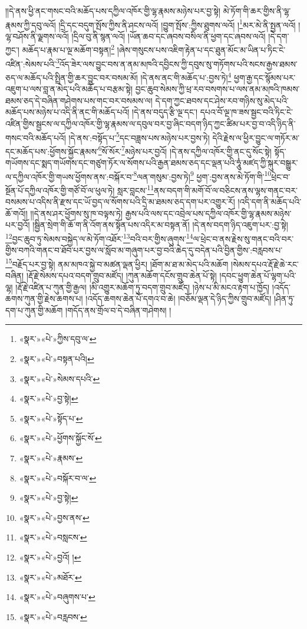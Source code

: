 །།དེ་ནས་ཕྱི་ནང་གསང་བའི་མཆོད་པས་དཀྱིལ་འཁོར་གྱི་ལྷ་རྣམས་མཉེས་པར་བྱ་སྟེ། མེ་ཏོག་གི་ཆར་གྱིས་ནི་ལྷ་རྣམས་ཀྱི་དབུ་ལའོ། །དྲི་དང་བདུག་སྤོས་ཀྱིས་ནི་ཤངས་ལའོ། །བྱུག་སྤོས་:ཀྱིས་ཐུགས་ལའོ། །\footnote{«སྣར་»«པེ་»ཀྱིས་དབུ་ལ་}མར་མེ་ནི་སྤྱན་ལའོ། །ལྷ་བཤོས་ནི་ལྗགས་ལའོ། །དྲིལ་བུ་ནི་སྙན་ལའོ། །ཡོན་ཆབ་དང་ཞབས་བསིལ་ནི་ཕྱག་དང་ཞབས་ལའོ། །དེ་དག་ཀྱང་། མཆོད་པ་རྣམ་པ་ལྔ་མཆོག་བསྟན།\footnote{«སྣར་»«པེ་»བསྟན་པའི།} །ཞེས་གསུངས་པས་འཇིག་རྟེན་པ་དང་ཐུན་མོང་མ་ཡིན་པ་ཏིང་ངེ་འཛིན་:སེམས་པའི་\footnote{«སྣར་»«པེ་»སེམས་དཔའི་}འོད་ཟེར་ལས་བྱུང་བས་ན་ནམ་མཁའི་དབྱིངས་ཀྱི་དབུས་སུ་གཏོགས་པའི་སངས་རྒྱས་ཐམས་ཅད་ལ་མཆོད་པའི་སྤྲིན་གྱི་ཆར་བྱུང་བར་བསམ་མོ། །དེ་ནས་ནང་གི་མཆོད་པ་:བྱས་ཏེ།\footnote{«སྣར་»«པེ་»བྱ་སྟེ།} ཕྱག་རྒྱ་དང་སྙོམས་པར་འཇུག་པ་ལས་བླ་ན་མེད་པའི་མཆོད་པ་བརྩམ་སྟེ། བྱང་ཆུབ་སེམས་ཀྱི་ཕྲ་རབ་བསགས་པ་ལས་ནམ་མཁའི་ཁམས་ཐམས་ཅད་དེ་བཞིན་གཤེགས་པས་གང་བར་བསམས་ལ། དེ་དག་ཀྱང་ཐབས་དང་ཤེས་རབ་གཉིས་སུ་མེད་པའི་མཆོད་པས་མཉེས་པ་འདི་ནི་ནང་གི་མཆོད་པའོ། །དེ་ནས་བདུད་རྩི་ལྔ་དང་། དཔའ་བོ་ལྔ་ཁ་ཟས་སྦྱང་བའི་ཏིང་ངེ་འཛིན་གྱིས་སྦྱངས་ལ་དཀྱིལ་འཁོར་གྱི་ལྷ་རྣམས་ལ་དབུལ་བར་བྱ་ཞིང་བདག་ཉིད་ཀྱང་ཚིམ་པར་བྱ་བ་འདི་ཉིད་ནི་གསང་བའི་མཆོད་པའོ། །དེ་ནས་:བསྟོད་པ་\footnote{«སྣར་»«པེ་»སྟོད་པ་}དང་བཟླས་པས་མཉེས་པར་བྱས་ཏེ། དེའི་རྗེས་ལ་ཕྱིར་བྱུང་ལ་གཏོར་མ་དང་མཆོད་པས་:ཕྱོགས་སྐྱོང་རྣམས་\footnote{«སྣར་»«པེ་»ཕྱོགས་སྐྱོང་སོ་}སོ་སོར་\footnote{«སྣར་»«པེ་»རྣམས་}མཉེས་པར་བྱའོ། །དེ་ནས་དཀྱིལ་འཁོར་གྱི་ནང་དུ་སོང་སྟེ། སྟོད་གཡོགས་དང་སྨད་གཡོགས་དང་གཙུག་ཏོར་ལ་སོགས་པའི་རྒྱན་ཐམས་ཅད་དང་ལྡན་པའི་ཧཱུཾ་མཛད་ཀྱི་སྐུར་བསྒྱུར་ལ་དཀྱིལ་འཁོར་གྱི་གཡས་ཕྱོགས་ནས་:བསྐོར་བ་\footnote{«སྣར་»«པེ་»བསྐོར་བ་ལ་}ལན་གསུམ་:བྱས་ཏེ།\footnote{«སྣར་»«པེ་»བྱ་སྟེ།} ཕྱག་:བྱས་ནས་མེ་ཏོག་གི་\footnote{«སྣར་»«པེ་»བྱས་ནས་}ཕྲེང་བ་སྔོན་པོ་དཀྱིལ་འཁོར་གྱི་གཙོ་བོ་ལ་ཕུལ་ཏེ། སླར་བླངས་\footnote{«སྣར་»«པེ་»བསླངས་}ནས་བདག་གི་མགོ་བོ་ལ་བཅིངས་ནས་ལྷས་གནང་བར་བསམས་པ་འདིས་ནི་རྫས་དང་ཡོ་བྱད་ལ་སོགས་པའི་དྲི་མ་ཐམས་ཅད་དག་པར་འགྱུར་རོ། །འདི་དག་ནི་མཆོད་པའི་ཆོ་གའོ།། །།དེ་ནས་ཤར་ཕྱོགས་སུ་ཁ་བལྟས་ཏེ། རྒྱས་པའི་ལས་དང་འབྲེལ་པས་དཀྱིལ་འཁོར་གྱི་ལྷ་རྣམས་མཉེས་པར་བྱའོ། །སྦྱིན་སྲེག་གི་ཆོ་ག་ནི་འོག་ནས་སྟོན་པས་འདིར་མ་བསྟན་ནོ། །དེ་ནས་བདག་ཉིད་འཇུག་པར་:བྱ་སྟེ། \footnote{«སྣར་»«པེ་»བྱའོ། ། }བྱང་ཆུབ་ཏུ་སེམས་བསྐྱེད་ལ་མེ་ཏོག་འཐོར་\footnote{«སྣར་»«པེ་»མཐོར་}བའི་བར་གྱིས་ཞུགས་\footnote{«སྣར་»«པེ་»བཞུགས་པ་}ལ་ཕྲེང་བ་ནས་རྗེས་སུ་གནང་བའི་བར་གྱིས་བཀའི་གནང་བ་ཐོབ་པར་བྱས་ལ་སློབ་མ་གཞུག་པར་བྱ་བའི་ཆེད་དུ་བདེན་པའི་བྱིན་གྱིས་:བརླབས་པ་\footnote{«སྣར་»«པེ་»བརླབས་}བརྗོད་པར་བྱ་སྟེ། ནམ་མཁའ་སྐྱེ་བ་མཚན་ལྡན་ཕྱིར། །ཐོག་མ་ཐ་མ་མེད་པའི་མཆོག །སེམས་དཔའ་རྡོ་རྗེ་ཆེ་རང་བཞིན། །རྡོ་རྗེ་སེམས་དཔའ་བདག་གྲུབ་མཛོད། །ཀུན་མཆོག་དངོས་གྲུབ་ཆེན་པོ་སྟེ། །དབང་ཕྱུག་ཆེན་པོ་ལྷག་པའི་ལྷ། །རྡོ་རྗེ་འཛིན་པ་ཀུན་གྱི་རྒྱལ། །མི་འགྱུར་མཆོག་ཏུ་བདག་གྲུབ་མཛོད། །ཉེས་པ་མི་མངའ་རྟག་པ་ཁྱོད། །འདོད་ཆགས་ཀུན་གྱི་རྗེས་ཆགས་པ། །འདོད་ཆགས་ཆེན་པོ་དགའ་བ་ཆེ། །བཅོམ་ལྡན་དེ་ཉིད་ཀྱིས་གྲུབ་མཛོད། །ཤིན་ཏུ་དག་པ་ཀུན་གྱི་མཆོག །གདོད་ནས་གྲོལ་བ་དེ་བཞིན་གཤེགས། །
